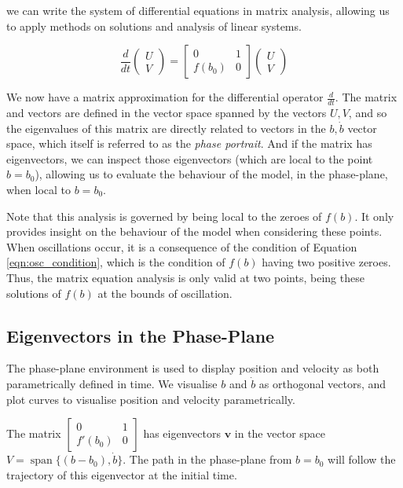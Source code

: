 \documentclass{article}
\begin{document}
we can write the system of differential equations in matrix analysis,
allowing us to apply methods on solutions and analysis of linear systems.

\begin{equation}
    \frac{d}{dt}\begin{pmatrix}
        U \\
        V
    \end{pmatrix} = \begin{bmatrix}
        0 & 1 \\
        f(b_0) & 0
    \end{bmatrix} \begin{pmatrix}
        U \\
        V
    \end{pmatrix}
    \label{eqn:matrix}
\end{equation}

We now have a matrix approximation for the differential operator $\frac{d}{dt}$.
The matrix and vectors are defined in the vector space spanned by the vectors $U,V$,
and so the eigenvalues of this matrix are directly related to vectors in the $b,\dot{b}$ vector space,
which itself is referred to as the \textit{phase portrait}.
And if the matrix has eigenvectors, we can inspect those eigenvectors (which are local to the point $b=b_0$),
allowing us to evaluate the behaviour of the model, in the phase-plane,
when local to $b=b_0$.

Note that this analysis is governed by being local to the zeroes of $f(b)$.
It only provides insight on the behaviour of the model when considering these points.
When oscillations occur, it is a consequence of the condition of Equation \ref{eqn:osc_condition},
which is the condition of $f(b)$ having two positive zeroes.
Thus, the matrix equation analysis is only valid at two points,
being these solutions of $f(b)$ at the bounds of oscillation.


\subsection{Eigenvectors in the Phase-Plane}

The phase-plane environment is used to display position and velocity as both parametrically defined in time.
We visualise $b$ and $\dot{b}$ as orthogonal vectors, and plot curves to visualise position and velocity parametrically.


The matrix $\begin{bmatrix}
	0 & 1 \\
	f'(b_0) & 0
\end{bmatrix}$ has eigenvectors $\mathbf{v}$ in the vector space $V = \operatorname{span}\{(b-b_0),\dot{b}\}$.
The path in the phase-plane from $b=b_0$ will follow the trajectory of this eigenvector at the initial time.
\end{document}
